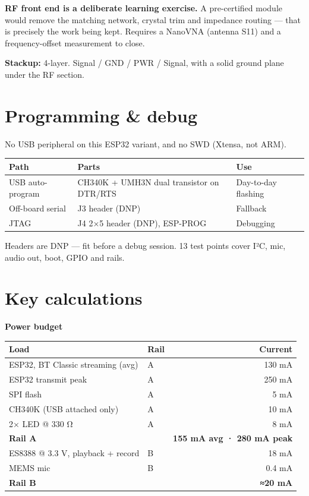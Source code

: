 \documentclass[11pt]{article}
\begin{document}
\textbf{RF front end is a deliberate learning exercise.} A pre-certified module would remove the
matching network, crystal trim and impedance routing — that is precisely the work being kept.
Requires a NanoVNA (antenna S11) and a frequency-offset measurement to close.

\textbf{Stackup:} 4-layer. Signal / GND / PWR / Signal, with a solid ground plane under the RF
section.

\section{Programming \& debug}

No USB peripheral on this ESP32 variant, and no SWD (Xtensa, not ARM).

\begin{tabularx}{\linewidth}{@{}l l X@{}}
\toprule
\textbf{Path} & \textbf{Parts} & \textbf{Use} \\
\midrule
USB auto-program & CH340K + UMH3N dual transistor on DTR/RTS & Day-to-day flashing \\
Off-board serial & J3 header (DNP) & Fallback \\
JTAG & J4 2×5 header (DNP), ESP-PROG & Debugging \\
\bottomrule
\end{tabularx}

Headers are DNP — fit before a debug session. 13 test points cover I²C, mic, audio out, boot, GPIO
and rails.

\section{Key calculations}

\textbf{Power budget}

\begin{tabularx}{\linewidth}{@{}X l r@{}}
\toprule
\textbf{Load} & \textbf{Rail} & \textbf{Current} \\
\midrule
ESP32, BT Classic streaming (avg) & A & 130 mA \\
ESP32 transmit peak & A & 250 mA \\
SPI flash & A & 5 mA \\
CH340K (USB attached only) & A & 10 mA \\
2× LED @ 330 Ω & A & 8 mA \\
\textbf{Rail A} & & \textbf{155 mA avg · 280 mA peak} \\
ES8388 @ 3.3 V, playback + record & B & 18 mA \\
MEMS mic & B & 0.4 mA \\
\textbf{Rail B} & & \textbf{≈20 mA} \\
\bottomrule
\end{tabularx}
\end{document}
